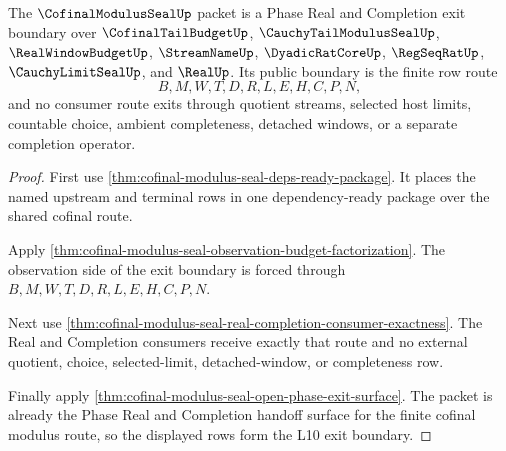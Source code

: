 \begin{theorem}
\label{thm:cofinal-modulus-seal-l10-exit-boundary}
The $\CofinalModulusSealUp$ packet is a Phase Real and Completion exit boundary over $\CofinalTailBudgetUp$, $\CauchyTailModulusSealUp$, $\RealWindowBudgetUp$, $\StreamNameUp$, $\DyadicRatCoreUp$, $\RegSeqRatUp$, $\CauchyLimitSealUp$, and $\RealUp$. Its public boundary is the finite row route
$$
B,M,W,T,D,R,L,E,H,C,P,N,
$$
and no consumer route exits through quotient streams, selected host limits, countable choice, ambient completeness, detached windows, or a separate completion operator.
\end{theorem}
\begin{proof}
First use \autoref{thm:cofinal-modulus-seal-deps-ready-package}. It places the named upstream and terminal rows in one dependency-ready package over the shared cofinal route.

Apply \autoref{thm:cofinal-modulus-seal-observation-budget-factorization}. The observation side of the exit boundary is forced through $B,M,W,T,D,R,L,E,H,C,P,N$.

Next use \autoref{thm:cofinal-modulus-seal-real-completion-consumer-exactness}. The Real and Completion consumers receive exactly that route and no external quotient, choice, selected-limit, detached-window, or completeness row.

Finally apply \autoref{thm:cofinal-modulus-seal-open-phase-exit-surface}. The packet is already the Phase Real and Completion handoff surface for the finite cofinal modulus route, so the displayed rows form the L10 exit boundary.
\end{proof}

